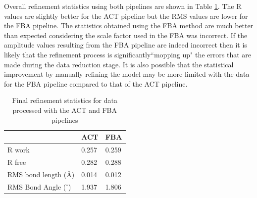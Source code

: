Overall refinement statistics using both pipelines are shown in Table \ref{tab:Refinement statistics - C.Esp1396I}.
The R values are slightly better for the ACT pipeline but the RMS values are lower for the FBA pipeline.
The statistics obtained using the FBA method are much better than expected considering the scale factor used in the FBA was incorrect.
If the amplitude values resulting from the FBA pipeline are indeed incorrect then it is likely that the refinement process is significantly``mopping up" the errors that are made during the data reduction stage.
It is also possible that the statistical improvement by manually refining the model may be more limited with the data for the FBA pipeline compared to that of the ACT pipeline.
\begin{table}[ht!]
	\caption{Final refinement statistics for data processed with the ACT and FBA pipelines}
	\centering
	\begin{tabular}{p{4cm} | p{2.5cm} | p{2.5cm}}
		   & ACT & FBA  \\
		\hline
		R work                      & 0.257   & 0.259 \\
		R free                      & 0.282   & 0.288 \\
		RMS bond length (\AA)       & 0.014   & 0.012 \\
        RMS Bond Angle ($^{\circ}$) & 1.937   & 1.806 \\
		\hline
	\end{tabular}
	\label{tab:Refinement statistics - C.Esp1396I}
\end{table}
